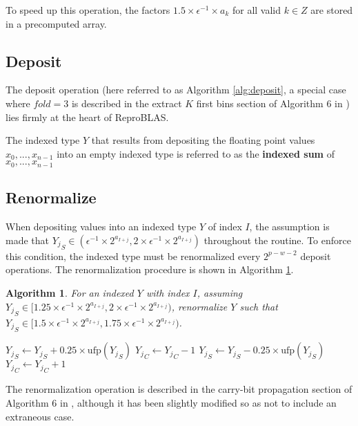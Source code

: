 \documentclass[12pt]{article}
\providecommand{\ufp}{\ensuremath{\text{ufp}}}
\theoremstyle{plain}
\newtheorem{alg}{Algorithm}[section]
\begin{document}
    To speed up this operation, the factors $1.5 \times \epsilon^{-1} \times a_k$ for all valid $k \in Z$ are stored in a precomputed array.

  \subsection{Deposit}
    The deposit operation (here referred to as Algorithm \ref{alg:deposit}, a special case where $fold = 3$ is described in the extract $K$ first bins section of Algorithm $6$ in \cite{repsum}) lies firmly at the heart of ReproBLAS.

    The indexed type $Y$ that results from depositing the floating point values $x_0, ..., x_{n - 1}$ into an empty indexed type is referred to as the \textbf{indexed sum} of $x_0, ..., x_{n - 1}$

  \subsection{Renormalize}
    \label{sec:renormalize}
    When depositing values into an indexed type $Y$ of index $I$, the assumption is made that ${Y_j}_S \in (\epsilon^{-1}\times 2^{a_{I + j}}, 2 \times \epsilon^{-1}\times 2^{a_{I + j}})$ throughout the routine. To enforce this condition, the indexed type must be renormalized every $2^{p - w - 2}$ deposit operations. The renormalization procedure is shown in Algorithm \ref{alg:renorm}.
    \begin{alg}
      For an indexed $Y$ with index $I$, assuming ${Y_j}_S \in [1.25 \times \epsilon^{-1}\times 2^{a_{I + j}}, 2 \times \epsilon^{-1}\times 2^{a_{I + j}})$, renormalize $Y$ such that ${Y_j}_S \in [1.5 \times \epsilon^{-1}\times 2^{a_{I + j}}, 1.75 \times \epsilon^{-1}\times 2^{a_{I + j}})$.
      \begin{algorithmic}
            \If{${Y_j}_S < 1.5 \times \ufp({Y_j}_S)$}
              \State ${Y_j}_S \gets {Y_j}_S + 0.25 \times \ufp({Y_j}_S)$
              \State ${Y_j}_C \gets {Y_j}_C - 1$
            \EndIf
            \If{${Y_j}_S \geq 1.75 \times \ufp({Y_j}_S)$}
              \State ${Y_j}_S \gets {Y_j}_S - 0.25 \times \ufp({Y_j}_S)$
              \State ${Y_j}_C \gets {Y_j}_C + 1$
            \EndIf
          \EndFor
        \EndFunction
      \end{algorithmic}
      \label{alg:renorm}
    \end{alg}
    The renormalization operation is described in the carry-bit propagation section of Algorithm $6$ in \cite{repsum}, although it has been slightly modified so as not to include an extraneous case.
\end{document}
